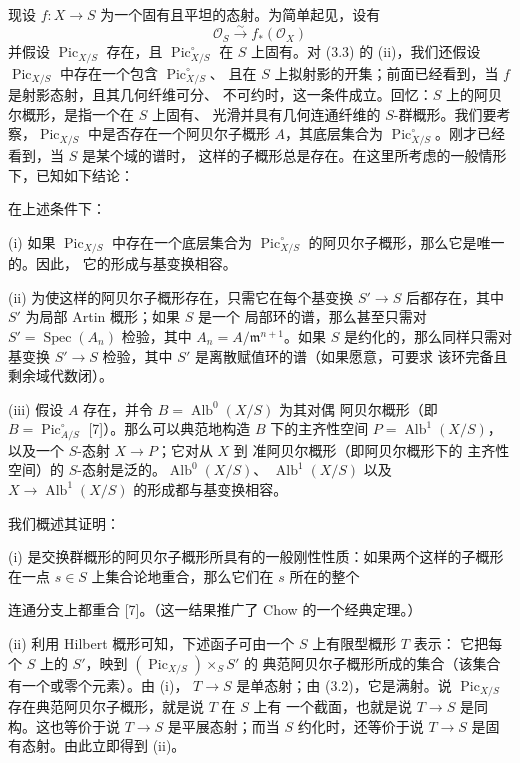 现设 $f:X\longrightarrow S$ 为一个固有且平坦的态射。为简单起见，设有
\[
\mathcal O_S\xrightarrow{\sim}f_*(\mathcal O_X)
\]
并假设 $\operatorname{Pic}_{X/S}$ 存在，且
$\operatorname{Pic}_{X/S}^\circ$ 在 $S$ 上固有。对 (3.3) 的 (ii)，我们还假设
$\operatorname{Pic}_{X/S}$ 中存在一个包含 $\operatorname{Pic}_{X/S}^\circ$、
且在 $S$ 上拟射影的开集；前面已经看到，当 $f$ 是射影态射，且其几何纤维可分、
不可约时，这一条件成立。回忆：$S$ 上的阿贝尔概形，是指一个在 $S$ 上固有、
光滑并具有几何连通纤维的 $S$-群概形。我们要考察，$\operatorname{Pic}_{X/S}$
中是否存在一个阿贝尔子概形 $A$，其底层集合为
$\operatorname{Pic}_{X/S}^\circ$。刚才已经看到，当 $S$ 是某个域的谱时，
这样的子概形总是存在。在这里所考虑的一般情形下，已知如下结论：

 在上述条件下：

\noindent(i) 如果 $\operatorname{Pic}_{X/S}$ 中存在一个底层集合为
$\operatorname{Pic}_{X/S}^\circ$ 的阿贝尔子概形，那么它是唯一的。因此，
它的形成与基变换相容。

\noindent(ii) 为使这样的阿贝尔子概形存在，只需它在每个基变换
$S'\longrightarrow S$ 后都存在，其中 $S'$ 为局部 Artin 概形；如果 $S$ 是一个
局部环的谱，那么甚至只需对 $S'=\operatorname{Spec}(A_n)$ 检验，其中
$A_n=A/\mathfrak m^{n+1}$。如果 $S$ 是约化的，那么同样只需对基变换
$S'\longrightarrow S$ 检验，其中 $S'$ 是离散赋值环的谱（如果愿意，可要求
该环完备且剩余域代数闭）。

\noindent(iii) 假设 $A$ 存在，并令 $B=\operatorname{Alb}^0(X/S)$ 为其对偶
阿贝尔概形（即 $B=\operatorname{Pic}_{A/S}^\circ$ [7]）。那么可以典范地构造
$B$ 下的主齐性空间 $P=\operatorname{Alb}^1(X/S)$，以及一个 $S$-态射
$X\longrightarrow P$；它对从 $X$ 到 准阿贝尔概形（即阿贝尔概形下的
主齐性空间）的 $S$-态射是泛的。$\operatorname{Alb}^0(X/S)$、
$\operatorname{Alb}^1(X/S)$ 以及 $X\longrightarrow\operatorname{Alb}^1(X/S)$
的形成都与基变换相容。

我们概述其证明：

(i) 是交换群概形的阿贝尔子概形所具有的一般刚性性质：如果两个这样的子概形
在一点 $s\in S$ 上集合论地重合，那么它们在 $s$ 所在的整个

连通分支上都重合 [7]。（这一结果推广了 Chow 的一个经典定理。）

(ii) 利用 Hilbert 概形可知，下述函子可由一个 $S$ 上有限型概形 $T$ 表示：
它把每个 $S$ 上的 $S'$，映到 $(\operatorname{Pic}_{X/S})\times_S S'$ 的
典范阿贝尔子概形所成的集合（该集合有一个或零个元素）。由 (i)，
$T\longrightarrow S$ 是单态射；由 (3.2)，它是满射。说
$\operatorname{Pic}_{X/S}$ 存在典范阿贝尔子概形，就是说 $T$ 在 $S$ 上有
一个截面，也就是说 $T\longrightarrow S$ 是同构。这也等价于说
$T\longrightarrow S$ 是平展态射；而当 $S$ 约化时，还等价于说
$T\longrightarrow S$ 是固有态射。由此立即得到 (ii)。

